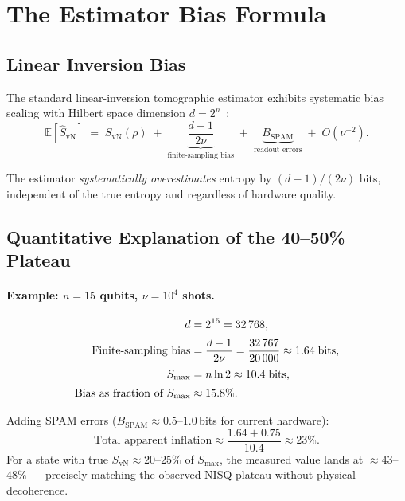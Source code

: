 \documentclass[12pt,letterpaper]{article}
\theoremstyle{plain}
\theoremstyle{definition}
\newcommand{\SvN}{S_{\mathrm{vN}}}
\newcommand{\Bspam}{B_{\mathrm{SPAM}}}
\newcommand{\hSvN}{\hat{S}_{\mathrm{vN}}}
\begin{document}
\section{The Estimator Bias Formula}
\label{sec:bias}

\subsection{Linear Inversion Bias}

The standard linear-inversion tomographic estimator exhibits systematic bias scaling with
Hilbert space dimension $d = 2^{n}$~\cite{Flammia2012}:
\begin{equation}
  \mathbb{E}[\hSvN]
  \;=\;
  \SvN(\rho)
  \;+\;
  \underbrace{\frac{d-1}{2\nu}}_{\text{finite-sampling bias}}
  \;+\;
  \underbrace{\Bspam}_{\text{readout errors}}
  \;+\;
  O\!\left(\nu^{-2}\right).
  \label{eq:bias}
\end{equation}

The estimator \emph{systematically overestimates} entropy by $(d-1)/(2\nu)$ bits, independent
of the true entropy and regardless of hardware quality.

\subsection{Quantitative Explanation of the 40--50\% Plateau}

\paragraph{Example: $n = 15$ qubits, $\nu = 10^{4}$ shots.}
\begin{align}
  d &= 2^{15} = 32\,768, \notag\\[2pt]
  \text{Finite-sampling bias} &= \frac{d-1}{2\nu}
      = \frac{32\,767}{20\,000} \approx 1.64\;\text{bits}, \notag\\[2pt]
  S_{\max} &= n\ln 2 \approx 10.4\;\text{bits}, \notag\\[2pt]
  \text{Bias as fraction of }S_{\max} &\approx 15.8\%.
\end{align}

Adding SPAM errors ($\Bspam \approx 0.5$--$1.0$\,bits for current hardware):
\begin{equation}
  \text{Total apparent inflation} \approx
  \frac{1.64 + 0.75}{10.4} \approx 23\%.
\end{equation}
For a state with true $\SvN \approx 20$--$25\%$ of $S_{\max}$, the measured value lands at
$\approx 43$--$48\%$ --- precisely matching the observed NISQ plateau without physical
decoherence.
\end{document}
